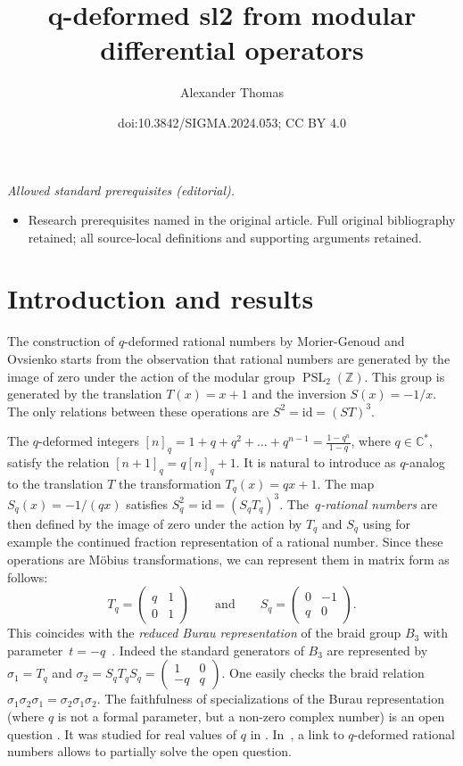 \documentclass[10pt,a4paper]{amsart}
\title{q-deformed sl2 from modular differential operators}
\author{Alexander Thomas}
\date{doi:10.3842/SIGMA.2024.053; CC BY 4.0}
\numberwithin{equation}{section}
\newcommand*{\C}{\mathbb{C}}
\newcommand*{\Z}{\mathbb{Z}}
\DeclareMathOperator{\PSL}{PSL}
\begin{document}
\maketitle
\noindent\textit{Allowed standard prerequisites (editorial).}\begin{itemize}
\item Research prerequisites named in the original article. Full original bibliography retained; all source-local definitions and supporting arguments retained.
\end{itemize}\medskip
\section{Introduction and results}

The construction of $q$-deformed rational numbers by Morier-Genoud and Ovsienko \cite{morier2020continued} starts from the observation that rational numbers are generated by the image of zero under the action of the modular group $\PSL_2(\Z)$. This group is generated by the translation $T(x)=x+1$ and the inversion $S(x)=-1/x$. The only relations between these operations are $S^2=\mathrm{id}=(ST)^3$.

The $q$-deformed integers $[n]_q=1+q+q^2+\dots +q^{n-1}=\frac{1-q^n}{1-q}$, where $q\in \C^*$, satisfy the relation $[n+1]_q=q[n]_q+1$. It is natural to introduce as $q$-analog to the translation $T$ the transformation $T_q(x)=qx+1$. The map $S_q(x)=-1/(qx)$ satisfies $S_q^2=\mathrm{id}=(S_qT_q)^3$. The~\emph{$q$-rational numbers} are then defined by the image of zero under the action by $T_q$ and $S_q$ using for example the continued fraction representation of a rational number. Since these operations are M\"obius transformations, we can represent them in matrix form as follows:
\[
T_q=\begin{pmatrix} q&1\\ 0 & 1 \end{pmatrix}\qquad \text{and}\qquad S_q=\begin{pmatrix} 0&-1\\ q & 0 \end{pmatrix}.
\]
This coincides with the \emph{reduced Burau representation} of the braid group $B_3$ with parameter~${t=-q}$~\cite{burau}. Indeed the standard generators of $B_3$ are represented by $\sigma_1=T_q$ and $\sigma_2=S_qT_qS_q=\left(\begin{smallmatrix}1 & 0 \\ -q & q\end{smallmatrix}\right)$. One easily checks the braid relation $\sigma_1\sigma_2\sigma_1=\sigma_2\sigma_1\sigma_2$. The faithfulness of specializations of the Burau representation (where $q$ is not a formal parameter, but a non-zero complex number) is an open question \cite[Section 7]{bharathram2021burau}. It was studied for real values of $q$ in \cite{scherich2020classification}. In~\cite{morier2023}, a link to $q$-deformed rational numbers allows to partially solve the open question.
\end{document}
